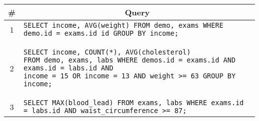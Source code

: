 \begin{tabular}{cl}
\toprule
\# & \multicolumn{1}{c}{Query} \\
\midrule
1 & \verb|SELECT income, AVG(weight) FROM demo, exams WHERE demo.id = exams.id id GROUP BY income;| {queryno} \label{q1} \\
2 & 
\begin{minipage}{6in}
\begin{lstlisting}[breaklines]
SELECT income, COUNT(*), AVG(cholesterol) 
FROM demo, exams, labs WHERE demos.id = exams.id AND exams.id = labs.id AND
income = 15 OR income = 13 AND weight >= 63 GROUP BY income;
\end{lstlisting}
\end{minipage}
{queryno} \label{q2} \\
3 & \verb|SELECT MAX(blood_lead) FROM exams, labs WHERE exams.id = labs.id AND waist_circumference >= 87;| {queryno} \label{q3} \\
\bottomrule
\end{tabular}
